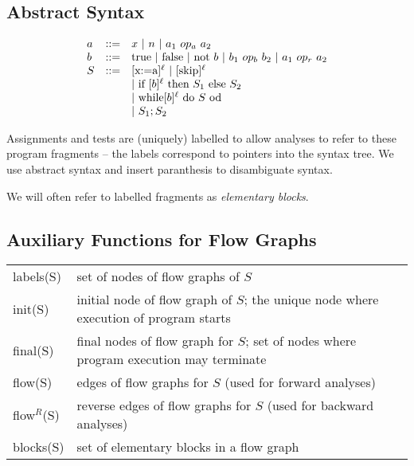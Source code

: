 \documentclass[natbib]{article}
\begin{document}
\subsection{Abstract Syntax}
\begin{displaymath}
\begin{array}{llll}
a & \textup{::=} & x ~|~ n ~|~ a_1~ op_a~ a_2 \\
b & \textup{::=} & \textup{true}~ |~ \textup{false}~ |~ \textup{not}~ b~ |~ b_1~ op_b~ b_2~ |~ a_1~ op_r~ a_2\\
S & \textup{::=} & [ \textup{x:=a} ]^\ell ~|~ [ \textup{skip}]^\ell\\
  &     & |~\textup{if}~ [b]^\ell~ \textup{then} ~S_1~  \textup{else}~ S_2\\ 
  &     & |~\textup{while} [b]^\ell~\textup{do} ~S~ \textup{od}\\
  &     & |~S_1;S_2\\
\end{array}
\end{displaymath}

\bigskip
Assignments and tests are (uniquely) labelled to allow analyses to refer
to these program fragments -- the labels correspond to pointers into the
syntax tree. We use abstract syntax and insert paranthesis to disambiguate syntax.

\bigskip
We will often refer to labelled fragments as {\em elementary blocks}.



\subsection{Auxiliary Functions for Flow Graphs}
\bigskip
\begin{tabular}{lp{9.5cm}}
labels(S) & set of nodes of flow graphs of $S$\\
init(S)   & initial node of flow graph of $S$; the unique node where execution of program starts\\
final(S)  & final nodes of flow graph for $S$; set of nodes where program execution may terminate\\
flow(S)   & edges of flow graphs for $S$ (used for forward analyses)\\
flow$^R$(S) & reverse edges of flow graphs for $S$ (used for backward analyses)\\
blocks(S) & set of elementary blocks in a flow graph
\end{tabular}
\end{document}
